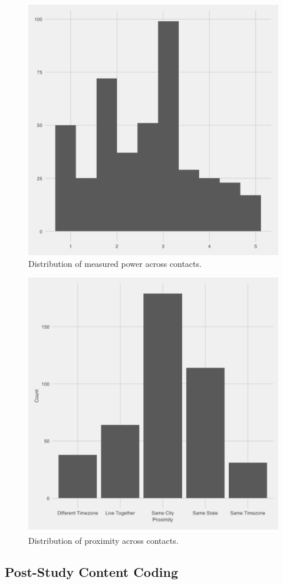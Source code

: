 \documentclass[12pt]{nuthesis}	%
\begin{document}
\begin{figure}[h]
\centering
\includegraphics[width=.7\textwidth]{figures/power_distribution}
\caption{Distribution of measured power across contacts.}
\label{fig:power}
\end{figure}

\begin{figure}[h]
\centering
\includegraphics[width=.7\textwidth]{figures/proximity_distribution}
\caption{Distribution of proximity across contacts.}
\label{fig:proximity}
\end{figure}


\subsection{Post-Study Content Coding}
\end{document}
